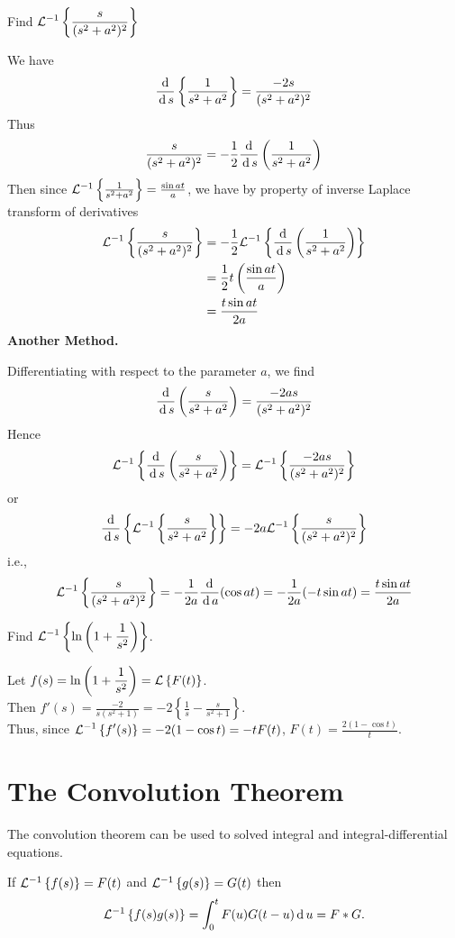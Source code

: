 \documentclass[../main-sheet.tex]{subfiles}
\begin{document}
\begin{prob}
    Find $\displaystyle \mathcal{L}^{-1}\left\{ \frac{s}{(s^2+a^2)^2}\right\} $
\end{prob}
\begin{soln}
    We have
    \[ \frac{\,\mathrm{d}\,}{\,\mathrm{d}\, s}\left\{ \frac{1}{s^2+a^2} \right\}=\frac{-2s}{(s^2+a^2)^2} \]
    Thus 
    \[\frac{s}{(s^2+a^2)^2}=-\frac{1}{2}\frac{\,\mathrm{d}\,}{\,\mathrm{d}\, s}\left( \frac{1}{s^2+a^2} \right) \]
    Then since $ \mathcal{L}^{-1}\left\{ \frac{1}{s^2+a^2}\right\}=\frac{\sin at}{a} $, we have by property of inverse Laplace transform of derivatives
    \begin{align*}
        \mathcal{L}^{-1}\left\{ \frac{s}{(s^2+a^2)^2}\right\}&=-\frac{1}{2} \mathcal{L}^{-1}\left\{ \frac{\,\mathrm{d}\, }{\,\mathrm{d}\, s}\left( \frac{1}{s^2+a^2} \right)\right\}\\
        &=\frac{1}{2}t \left( \frac{\sin at}{a} \right)\\
        &=\frac{t \sin at}{2a}
    \end{align*}
    \textbf{Another Method.}

    Differentiating with respect to the parameter $ a $, we find
    \[
        \frac{\,\mathrm{d}\,}{\,\mathrm{d}\, s}\left( \frac{s}{s^2+a^2} \right)=\frac{-2as}{(s^2+a^2)^2}
    \]
    Hence
    \[
        \mathcal{L}^{-1}\left\{ \frac{\,\mathrm{d}\,}{\,\mathrm{d}\, s}\left( \frac{s}{s^2+a^2} \right)\right\}=\mathcal{L}^{-1}\left\{ \frac{-2as}{(s^2+a^2)^2}\right\}
    \]
    or
    \[
        \frac{\,\mathrm{d}\,}{\,\mathrm{d}\, s}\left\{\mathcal{L}^{-1}\left\{ \frac{s}{s^2+a^2}\right\}\right\}=-2a\mathcal{L}^{-1}\left\{ \frac{s}{(s^2+a^2)^2}\right\}
    \]
    i.e.,
    \[
        \mathcal{L}^{-1}\left\{ \frac{s}{(s^2+a^2)^2}\right\}=-\frac{1}{2a}\frac{\,\mathrm{d}\,}{\,\mathrm{d}\, a}(\cos at)=-\frac{1}{2a}(-t \sin at)=\frac{t \sin at}{2a}
    \]
\end{soln}
\begin{prob}
    Find $\displaystyle \mathcal{L}^{-1}\left\{ \ln \left( 1+\frac{1}{s^2} \right)\right\} $.
\end{prob}
\begin{soln}
    Let $\displaystyle f(s)=\ln \left( 1+\frac{1}{s^2} \right)=\mathcal{L}\left\{ F(t)\right\} $.\\
    Then $\displaystyle f'(s)=\frac{-2}{s(s^2+1)}=-2\left\{ \frac{1}{s}-\frac{s}{s^2+1} \right\} $.\\
    Thus, since $\displaystyle \mathcal{L}^{-1}\left\{ f'(s)\right\}=-2(1-\cos t)=-t F(t)$, $ F(t)=\frac{2(1-\cos t)}{t} $.
\end{soln}
\section{The Convolution Theorem}
The convolution theorem can be used to solved integral and integral-differential equations.
\begin{thm}
    If $ \mathcal{L}^{-1}\left\{ f(s)\right\}=F(t) $ and $ \mathcal{L}^{-1}\left\{ g(s)\right\}=G(t) $ then
    \[
        \mathcal{L}^{-1}\left\{ f(s)g(s)\right\}=\int_0^t F(u) G(t-u) \,\mathrm{d}\, u=F*G.
    \]
\end{thm}
\end{document}
